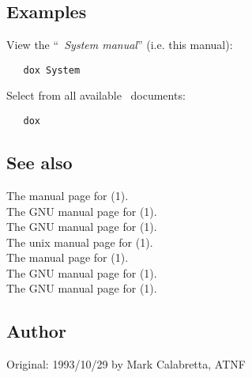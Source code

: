 \subsection*{Examples}

View the ``\textit{\aipspp\ System manual}'' (i.e. this manual):

\begin{verbatim}
   dox System
\end{verbatim}

\noindent
Select from all available \aipspp\ documents:

\begin{verbatim}
   dox
\end{verbatim}

\subsection*{See also}

The manual page for (1).\\
The GNU manual page for (1).\\
The GNU manual page for (1).\\
The unix manual page for (1).\\
The manual page for (1).\\
The GNU manual page for (1).\\
The GNU manual page for (1).

\subsection*{Author}

Original: 1993/10/29 by Mark Calabretta, ATNF
